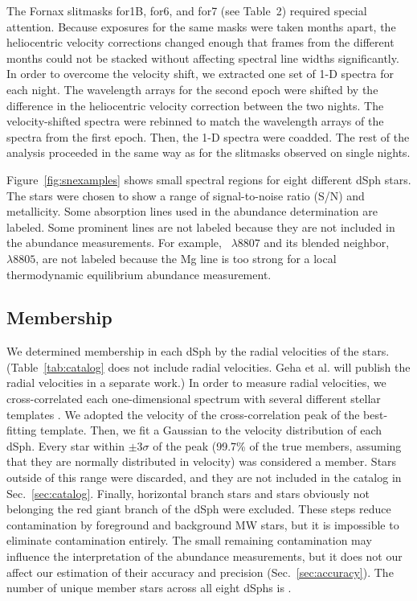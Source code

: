 \documentclass{emulateapj}
\begin{document}
The Fornax slitmasks for1B, for6, and for7 (see Table~2) required
special attention.  Because exposures for the same masks were taken
months apart, the heliocentric velocity corrections changed enough
that frames from the different months could not be stacked without
affecting spectral line widths significantly.  In order to overcome
the velocity shift, we extracted one set of 1-D spectra for each
night.  The wavelength arrays for the second epoch were shifted by the
difference in the heliocentric velocity correction between the two
nights.  The velocity-shifted spectra were rebinned to match the
wavelength arrays of the spectra from the first epoch.  Then, the 1-D
spectra were coadded.  The rest of the analysis proceeded in the same
way as for the slitmasks observed on single nights.

Figure~\ref{fig:snexamples} shows small spectral regions for eight
different dSph stars.  The stars were chosen to show a range of
signal-to-noise ratio (S/N) and metallicity.  Some absorption lines
used in the abundance determination are labeled.  Some prominent lines
are not labeled because they are not included in the abundance
measurements.  For example, ~$\lambda 8807$ and its blended
neighbor, ~$\lambda 8805$, are not labeled because the Mg
line is too strong for a local thermodynamic equilibrium abundance
measurement.

\subsection{Membership}

We determined membership in each dSph by the radial velocities of the
stars.  (Table~\ref{tab:catalog} does not include radial velocities.
Geha et al\@. will publish the radial velocities in a separate work.)
In order to measure radial velocities, we cross-correlated each
one-dimensional spectrum with several different stellar templates
\citep[see][]{sim07}.  We adopted the velocity of the
cross-correlation peak of the best-fitting template.  Then, we fit a
Gaussian to the velocity distribution of each dSph.  Every star within
$\pm 3\sigma$ of the peak (99.7\% of the true members, assuming that
they are normally distributed in velocity) was considered a member.
Stars outside of this range were discarded, and they are not included
in the catalog in Sec.~\ref{sec:catalog}.  Finally, horizontal branch
stars and stars obviously not belonging the red giant branch of the
dSph were excluded.  These steps reduce contamination by foreground
and background MW stars, but it is impossible to eliminate
contamination entirely.  The small remaining contamination may
influence the interpretation of the abundance measurements, but it
does not our affect our estimation of their accuracy and precision
(Sec.~\ref{sec:accuracy}).  The number of unique member stars across
all eight dSphs is \ndsphstars.
\end{document}
